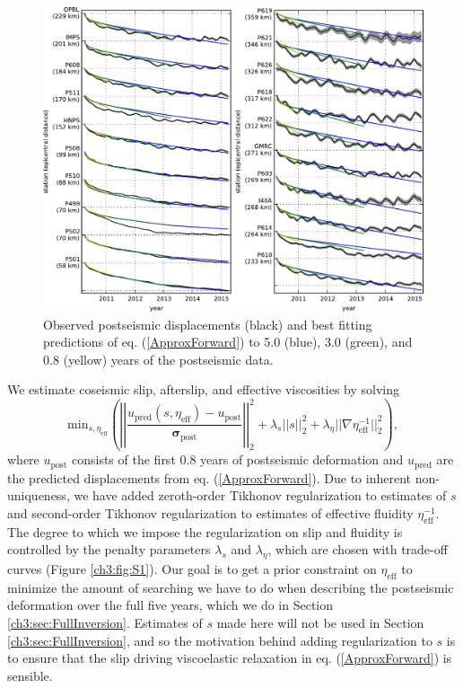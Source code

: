 \begin{figure}
\includegraphics[scale=0.9]{ch3/figures/2016jb013114-p10}
\caption{Observed postseismic displacements (black) and best fitting
predictions of eq. (\ref{ApproxForward}) to 5.0 (blue), 3.0 (green),
and 0.8 (yellow) years of the postseismic data.}
\label{ch3:fig:RecordSection1}
\end{figure}

We estimate coseismic slip, afterslip, and effective viscosities by
solving
\begin{equation}\label{ObjectiveFunction}
 \mathrm{min}_{s,\eta_\mathrm{eff}} \left(\left|\left|
 \frac{u_\mathrm{pred}(s,\eta_\mathrm{eff}) - u_\mathrm{post}}
 {\mathbf{\sigma_\mathrm{post}}}\right|\right|_2^2 + 
 \lambda_s||s||_2^2 + 
 \lambda_\eta||\nabla \eta_{\mathrm{eff}}^{-1}||_2^2\right),
\end{equation} 
where $u_\mathrm{post}$ consists of the first 0.8 years of postseismic
deformation and $u_\mathrm{pred}$ are the predicted displacements from
eq. (\ref{ApproxForward}).  Due to inherent non-uniqueness, we have
added zeroth-order Tikhonov regularization to estimates of $s$ and
second-order Tikhonov regularization to estimates of effective
fluidity $\eta_\mathrm{eff}^{-1}$. The degree to which we impose the
regularization on slip and fluidity is controlled by the penalty
parameters $\lambda_s$ and $\lambda_\eta$, which are chosen with
trade-off curves (Figure \ref{ch3:fig:S1}).  Our goal is to get a prior constraint
on $\eta_{\mathrm{eff}}$ to minimize the amount of searching we have
to do when describing the postseismic deformation over the full five
years, which we do in Section \ref{ch3:sec:FullInversion}.  Estimates
of $s$ made here will not be used in Section
\ref{ch3:sec:FullInversion}, and so the motivation behind adding
regularization to $s$ is to ensure that the slip driving viscoelastic
relaxation in eq. (\ref{ApproxForward}) is sensible.

